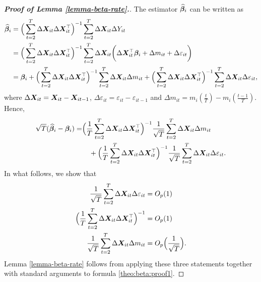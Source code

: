 \begin{proof}[\textnormal{\textbf{Proof of Lemma \ref{lemma-beta-rate}.}}]
The estimator $\widehat{\bm{\beta}}_i$ can be written as
\begin{align*}
\widehat{\bm{\beta}}_i &= \Big( \sum_{t=2}^T \Delta \boldsymbol{X}_{it} \Delta \boldsymbol{X}_{it}^\top \Big)^{-1} \sum_{t=2}^T \Delta \boldsymbol{X}_{it} \Delta Y_{it} \\
& =  \Big( \sum_{t=2}^T \Delta \boldsymbol{X}_{it} \Delta \boldsymbol{X}_{it}^\top \Big)^{-1} \sum_{t=2}^T \Delta \boldsymbol{X}_{it} \bigg(\Delta \boldsymbol{X}_{it}^\top \bm{\beta}_i +  \Delta m_{it}+ \Delta \varepsilon_{it} \bigg) \\
&= \bm{\beta}_i + \Big( \sum_{t=2}^T \Delta \boldsymbol{X}_{it} \Delta \boldsymbol{X}_{it}^\top \Big)^{-1} \sum_{t=2}^T \Delta \boldsymbol{X}_{it} \Delta m_{it} +  \Big( \sum_{t=2}^T \Delta \boldsymbol{X}_{it} \Delta \boldsymbol{X}_{it}^\top \Big)^{-1} \sum_{t=2}^T \Delta \boldsymbol{X}_{it} \Delta \varepsilon_{it}, 
\end{align*}
where $\Delta \boldsymbol{X}_{it} = \boldsymbol{X}_{it} - \boldsymbol{X}_{it-1}$, $\Delta \varepsilon_{it} = \varepsilon_{it} - \varepsilon_{it-1}$ and $\Delta m_{it} = m_i (\frac{t}{T}) - m_i(\frac{t-1}{T})$. Hence, 
\begin{align}
 \sqrt{T}( \widehat{\bm{\beta}}_i - \bm{\beta}_i) = &\Big( \frac{1}{T}\sum_{t=2}^T \Delta \boldsymbol{X}_{it} \Delta \boldsymbol{X}_{it}^\top \Big)^{-1} \frac{1}{\sqrt{T}}\sum_{t=2}^T \Delta \boldsymbol{X}_{it} \Delta m_{it} \nonumber \\
&\quad+  \Big(\frac{1}{T} \sum_{t=2}^T \Delta \boldsymbol{X}_{it} \Delta \boldsymbol{X}_{it}^\top \Big)^{-1}\frac{1}{\sqrt{T}} \sum_{t=2}^T \Delta \boldsymbol{X}_{it} \Delta \varepsilon_{it}. \label{theo:beta:proof1}
\end{align}
In what follows, we show that 
\begin{align}
\frac{1}{\sqrt{T}} \sum_{t=2}^T \Delta \boldsymbol{X}_{it} \Delta \varepsilon_{it} & = O_p(1) \label{lemma-beta-rate-claim1} \\
\Big( \frac{1}{T}\sum_{t=2}^T \Delta \boldsymbol{X}_{it} \Delta \boldsymbol{X}_{it}^\top \Big)^{-1} & = O_p(1) \label{lemma-beta-rate-claim2} \\
\frac{1}{\sqrt{T}} \sum_{t=2}^T \Delta \boldsymbol{X}_{it} \Delta m_{it} & = O_p\Big(\frac{1}{\sqrt{T}}\Big). \label{lemma-beta-rate-claim3}
\end{align} 
Lemma \ref{lemma-beta-rate} follows from applying these three statements together with standard arguments to formula \eqref{theo:beta:proof1}.



\end{proof}
